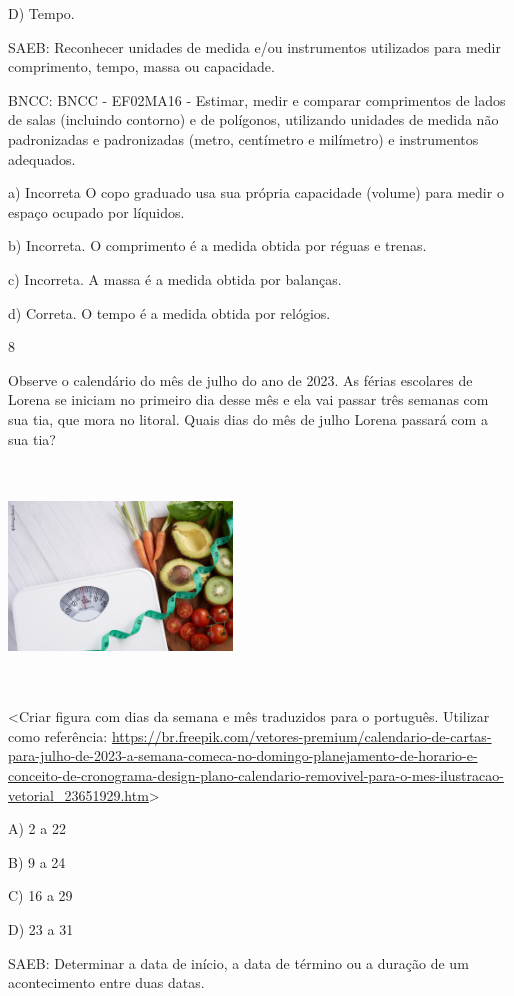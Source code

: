 \begin{escolha}
\begin{escolha}
{{{{D) Tempo.

SAEB: Reconhecer unidades de medida e/ou instrumentos utilizados
para medir comprimento, tempo, massa ou capacidade.

BNCC: BNCC - EF02MA16 - Estimar, medir e comparar comprimentos de lados
de salas (incluindo contorno) e de polígonos, utilizando unidades de
medida não padronizadas e padronizadas (metro, centímetro e milímetro) e
instrumentos adequados. 

a) Incorreta O copo graduado usa sua própria capacidade (volume) para
medir o espaço ocupado por líquidos.

b) Incorreta. O comprimento é a medida obtida por réguas e trenas.

c) Incorreta. A massa é a medida obtida por balanças.

d) Correta. O tempo é a medida obtida por relógios.

\num{8}

Observe o calendário do mês de julho do ano de 2023. As férias escolares
de Lorena se iniciam no primeiro dia desse mês e ela vai passar três
semanas com sua tia, que mora no litoral. Quais dias do mês de julho
Lorena passará com a sua tia?

\includegraphics[width=2.34444in,height=2.34933in]{media/image137.png}

\textless{}Criar figura com dias da semana e mês traduzidos para o
português. Utilizar como referência:
\url{https://br.freepik.com/vetores-premium/calendario-de-cartas-para-julho-de-2023-a-semana-comeca-no-domingo-planejamento-de-horario-e-conceito-de-cronograma-design-plano-calendario-removivel-para-o-mes-ilustracao-vetorial_23651929.htm}\textgreater{}

A) 2 a 22

B) 9 a 24

C) 16 a 29

D) 23 a 31

SAEB: Determinar a data de início, a data de término ou a
duração de um acontecimento entre duas datas.

}}}}
\end{escolha}
\end{escolha}
